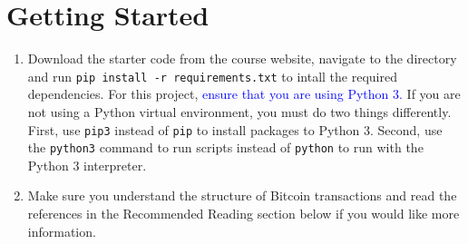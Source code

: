 \documentclass[11pt]{article}
\begin{document}
\section{Getting Started}
\begin{enumerate}
\item Download the starter code from the course website, navigate to the directory and run \texttt{pip install -r requirements.txt} to intall the required dependencies. For this project, \textcolor{blue}{ensure that you are using Python 3.} If you are not using a Python virtual environment, you must do two things differently. First, use \texttt{pip3} instead of \texttt{pip} to install packages to Python 3. Second, use the \texttt{python3} command to run scripts instead of \texttt{python} to run with the Python 3 interpreter.

\item Make sure you understand the structure of Bitcoin transactions and read the references in the Recommended Reading section below if you would like more information.


\end{enumerate}
\end{document}
